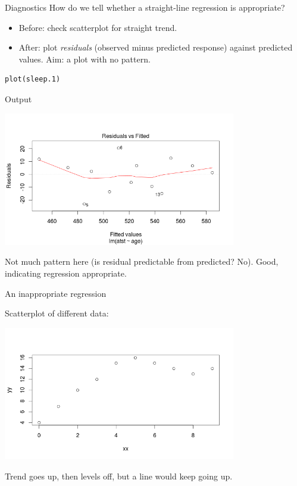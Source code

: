 \begin{frame}[fragile]{Diagnostics}
How do we tell whether a straight-line regression is appropriate?

\vspace{3ex}

\begin{itemize}
\item Before: check scatterplot for straight trend.
\item After: plot {\em residuals} (observed minus predicted response) against predicted values. Aim: a plot with no pattern.
\end{itemize}

\vspace{3ex}

\begin{verbatim}
plot(sleep.1)
\end{verbatim}

\end{frame}

\begin{frame}[fragile]{Output}

\includegraphics[width=4in]{sleep-resid}

Not much pattern here (is residual predictable from predicted? No). Good, indicating regression appropriate.
  
\end{frame}


\begin{frame}[fragile]{An inappropriate regression}

Scatterplot of different data:

\includegraphics[width=4in]{curvy-scatter}

Trend goes up, then levels off, but a line would keep going up.

\end{frame}

